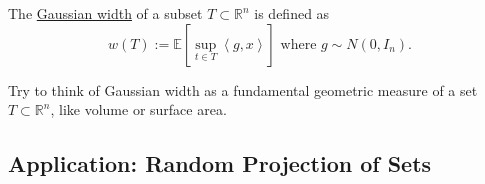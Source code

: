 \begin{definition}[]
\label{def:7.5.1}
The \underline{Gaussian width} of a subset $T \subset \mathbb{R}^n$ is defined as 
\[ w(T) := \mathbb{E}\left[ \sup_{t \in T}\left\langle g, x \right\rangle \right] \text{ where } 
g \sim N(0, I_n). \]
\end{definition}

Try to think of Gaussian width as a fundamental geometric measure of a set $T \subset \mathbb{R}^n$, like 
volume or surface area.





\subsection{Application: Random Projection of Sets}
